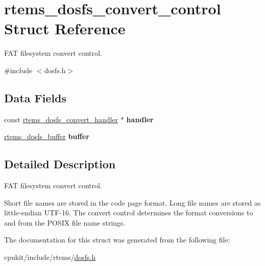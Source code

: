\hypertarget{structrtems__dosfs__convert__control}{}\section{rtems\+\_\+dosfs\+\_\+convert\+\_\+control Struct Reference}
\label{structrtems__dosfs__convert__control}


F\+AT filesystem convert control.  




{\ttfamily \#include $<$dosfs.\+h$>$}

\subsection*{Data Fields}
\begin{DoxyCompactItemize}
\item 
\mbox{\label{structrtems__dosfs__convert__control_a1652abbe0ca902de0bfce574bce367ca}} 
const \mbox{\hyperlink{structrtems__dosfs__convert__handler}{rtems\+\_\+dosfs\+\_\+convert\+\_\+handler}} $\ast$ {\bfseries handler}
\item 
\mbox{\label{structrtems__dosfs__convert__control_a8b864b0ba9851a821654f0c855f6d207}} 
\mbox{\hyperlink{structrtems__dosfs__buffer}{rtems\+\_\+dosfs\+\_\+buffer}} {\bfseries buffer}
\end{DoxyCompactItemize}


\subsection{Detailed Description}
F\+AT filesystem convert control. 

Short file names are stored in the code page format. Long file names are stored as little-\/endian U\+T\+F-\/16. The convert control determines the format conversions to and from the P\+O\+S\+IX file name strings. 

The documentation for this struct was generated from the following file\+:\begin{DoxyCompactItemize}
\item 
cpukit/include/rtems/\mbox{\hyperlink{dosfs_8h}{dosfs.\+h}}\end{DoxyCompactItemize}
